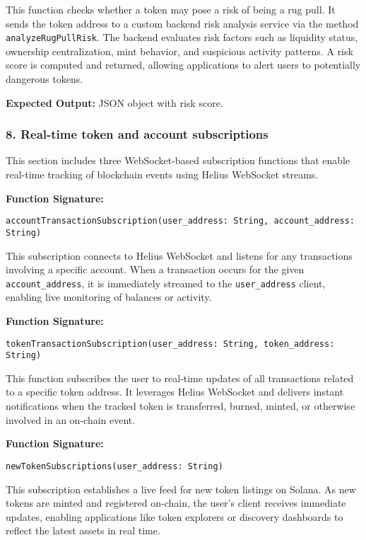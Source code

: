 \documentclass[
]{article}
\begin{document}
This function checks whether a token may pose a risk of being a rug pull. It sends the token address to a custom backend risk analysis service via the method \texttt{analyzeRugPullRisk}. The backend evaluates risk factors such as liquidity status, ownership centralization, mint behavior, and suspicious activity patterns. A risk score is computed and returned, allowing applications to alert users to potentially dangerous tokens.

\textbf{Expected Output:} JSON object with risk score.

\subsubsection{8. Real-time token and account subscriptions}
This section includes three WebSocket-based subscription functions that enable real-time tracking of blockchain events using Helius WebSocket streams.

\textbf{Function Signature:}
\begin{verbatim}
accountTransactionSubscription(user_address: String, account_address: String)
\end{verbatim}

This subscription connects to Helius WebSocket and listens for any transactions involving a specific account. When a transaction occurs for the given \texttt{account\_address}, it is immediately streamed to the \texttt{user\_address} client, enabling live monitoring of balances or activity.

\textbf{Function Signature:}
\begin{verbatim}
tokenTransactionSubscription(user_address: String, token_address: String)
\end{verbatim}

This function subscribes the user to real-time updates of all transactions related to a specific token address. It leverages Helius WebSocket and delivers instant notifications when the tracked token is transferred, burned, minted, or otherwise involved in an on-chain event.

\textbf{Function Signature:}
\begin{verbatim}
newTokenSubscriptions(user_address: String)
\end{verbatim}

This subscription establishes a live feed for new token listings on Solana. As new tokens are minted and registered on-chain, the user’s client receives immediate updates, enabling applications like token explorers or discovery dashboards to reflect the latest assets in real time.
\end{document}

